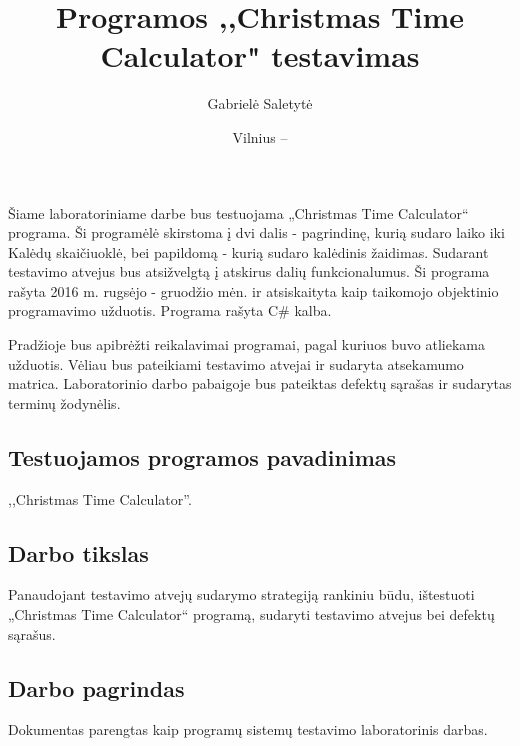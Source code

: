 \documentclass{VUMIFPSkursinis}
\title{Programos ,,Christmas Time Calculator" testavimas}
\author{Gabrielė Saletytė}
\date{Vilnius – \the\year}
\begin{document}
    \newenvironment{innerParagraph}[1][0.5cm]{\begin{adjustwidth}{#1}{}}{\end{adjustwidth}}
        
    \maketitle
    \tableofcontents
	
	 \label{anotacija}
		Šiame laboratoriniame darbe bus testuojama „Christmas Time Calculator“ programa.
		Ši programėlė skirstoma į dvi dalis - pagrindinę, kurią sudaro laiko iki Kalėdų skaičiuoklė, bei papildomą - 
		kurią sudaro kalėdinis žaidimas.
		Sudarant testavimo atvejus bus atsižvelgtą į atskirus dalių funkcionalumus.
		Ši programa rašyta 2016 m. rugsėjo - gruodžio mėn. ir atsiskaityta kaip taikomojo objektinio programavimo užduotis.
		Programa rašyta C# kalba.

		Pradžioje bus apibrėžti reikalavimai programai, pagal kuriuos buvo atliekama užduotis.
		Vėliau bus pateikiami testavimo atvejai ir sudaryta atsekamumo matrica.
		Laboratorinio darbo pabaigoje bus pateiktas defektų sąrašas ir sudarytas terminų žodynėlis.
	 \label{ivadas}
		\subsection*{Testuojamos programos pavadinimas} \label{ivadas_psPavadinimas}
			,,Christmas Time Calculator''.
		\subsection*{Darbo tikslas} \label{ivadas_darboTikslas}
			Panaudojant testavimo atvejų sudarymo strategiją rankiniu būdu, 
			ištestuoti „Christmas Time Calculator“ programą, sudaryti testavimo atvejus bei defektų sąrašus.
		\subsection*{Darbo pagrindas} \label{ivadas_pagrindas}
			Dokumentas parengtas kaip programų sistemų testavimo laboratorinis darbas.
	
\end{document}

